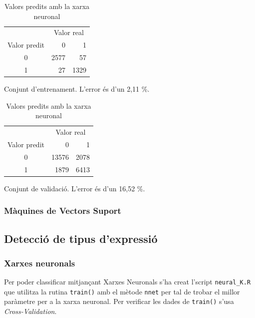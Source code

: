\documentclass[a4paper]{article}
\begin{document}
\begin{table}[H]
	\def\arraystretch{1.5}
	\begin{subtable}[t]{0.49\textwidth}
		\centering
		\begin{tabular}{|c|rr|}
			\hline
			& \multicolumn{2}{c|}{Valor real} \\
			Valor predit & 0 & 1 \\
			\hline
			0 & 2577 & 57 \\
			1 &   27 & 1329 \\
			\hline
		\end{tabular}
		\caption{Conjunt d'entrenament. L'error és d'un 2,11 \%.}
		\label{tab:nnet_yes_no1}
	\end{subtable}
	\hfill
	\begin{subtable}[t]{0.49\textwidth}
		\centering
		\begin{tabular}{|c|rr|}
			\hline
			& \multicolumn{2}{c|}{Valor real} \\
			Valor predit & 0 & 1 \\
			\hline
			0 & 13576 & 2078 \\
			1 &  1879 & 6413 \\
			\hline
		\end{tabular}
		\caption{Conjunt de validació. L'error és d'un 16,52 \%.}
		\label{tab:nnet_yes_no2}
	\end{subtable}
	\caption{Valors predits amb la xarxa neuronal}
\end{table}

\subsubsection{Màquines de Vectors Suport}

\subsection{Detecció de tipus d'expressió}
\subsubsection{Xarxes neuronals}

Per poder classificar mitjançant Xarxes Neuronals s'ha creat l'script \verb|neural_K.R| que utilitza la rutina \verb|train()| amb el mètode \verb|nnet| per tal de trobar el millor paràmetre per a la xarxa neuronal. Per verificar les dades de \verb|train()| s'usa \emph{Cross-Validation}.
\end{document}
